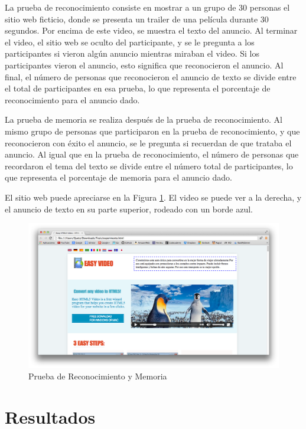 La prueba de reconocimiento consiste en mostrar a un grupo de 30 personas el sitio web ficticio, donde se presenta un trailer de una película  durante 30 segundos. Por encima de este video, se muestra el texto del anuncio. Al terminar el video, el sitio web se oculto del participante, y se le pregunta a los participantes si vieron algún anuncio mientras miraban el video. Si los participantes vieron el anuncio, esto significa que reconocieron el anuncio. Al final, el número de personas que reconocieron el anuncio de texto se divide entre el total de participantes en esa prueba, lo que representa el porcentaje de reconocimiento para el anuncio dado. 

La prueba de memoria se realiza después de la prueba de reconocimiento. Al mismo grupo de personas que participaron en la prueba de reconocimiento, y que reconocieron con éxito el anuncio, se le pregunta si recuerdan de que trataba el anuncio. Al igual que en la prueba de reconocimiento, el número de personas que recordaron el tema del texto se divide entre el número total de participantes, lo que representa el porcentaje de memoria para el anuncio dado. 

El sitio web puede apreciarse en la Figura \ref{experimento}. El video se puede ver a la derecha, y el anuncio de texto en su parte superior, rodeado con un borde azul.

\begin{figure}[htp]
  \centerline{\includegraphics[width=7in]{experimento.png}} 
  \caption{Prueba de Reconocimiento y Memoria } 
\label{experimento}
\end{figure}

\section{Resultados}

